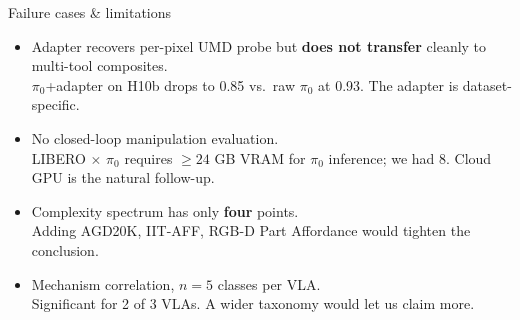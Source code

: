 \documentclass[10pt,aspectratio=169]{beamer}
\newcommand{\hl}[1]{\textcolor{emph}{\textbf{#1}}}
\begin{document}
\begin{frame}{Failure cases \& limitations}
  \begin{itemize}\setlength{\itemsep}{0.5em}
    \item Adapter recovers per-pixel UMD probe but \hl{does not transfer} cleanly to multi-tool composites.\\
      {\small\color{muted}$\pi_0$+adapter on H10b drops to 0.85 vs.\ raw $\pi_0$ at 0.93. The adapter is dataset-specific.}
    \item No closed-loop manipulation evaluation.\\
      {\small\color{muted}LIBERO $\times$ $\pi_0$ requires $\geq 24$ GB VRAM for $\pi_0$ inference; we had 8. Cloud GPU is the natural follow-up.}
    \item Complexity spectrum has only \textbf{four} points.\\
      {\small\color{muted}Adding AGD20K, IIT-AFF, RGB-D Part Affordance would tighten the conclusion.}
    \item Mechanism correlation, $n = 5$ classes per VLA.\\
      {\small\color{muted}Significant for 2 of 3 VLAs. A wider taxonomy would let us claim more.}
  \end{itemize}
\end{frame}
\end{document}
